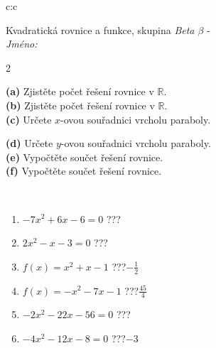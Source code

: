 \documentclass[10pt]{report}
\begin{document}
\begin{tabular}{c:c}
\begin{minipage}[c][104.5mm][t]{0.5\linewidth}
\begin{center}
\vspace{7mm}
{\huge \LARGE Kvadratická rovnice a funkce, skupina \textit{Beta $\beta$} -}\\[5mm]
\textit{Jméno:}\phantom{xxxxxxxxxxxxxxxxxxxxxxxxxxxxxxxxxxxxxxxxxxxxxxxxxxxxxxxxxxxxxxxxx}\\[5mm]
\begin{minipage}{0.95\linewidth}
\begin{center}
{\small \begin{multicols}{2} \raggedright
\textbf{(a)} Zjistěte počet řešení rovnice v \(\mathbb{R}\). \\[1mm]
\textbf{(b)} Zjistěte počet řešení rovnice v \(\mathbb{R}\). \\[1mm]
\textbf{(c)} Určete \(x\)-ovou souřadnici vrcholu paraboly. \par \columnbreak
\textbf{(d)} Určete \(y\)-ovou souřadnici vrcholu paraboly. \\[1mm]
\textbf{(e)} Vypočtěte součet řešení rovnice. \\[1mm]
\textbf{(f)} Vypočtěte součet řešení rovnice.
\end{multicols}
}
\end{center}
\end{minipage}
\\[4mm]
\begin{minipage}{0.79\linewidth}
\begin{center}
\begin{varwidth}{\linewidth}
\begin{enumerate}
\Large
\item $-7x^2+6x-6=0$\quad \dotfill\; ???\;\dotfill {}
\item $2x^2-x-3=0$\quad \dotfill\; ???\;\dotfill {}
\item $f(x)=x^2+x-1$\quad \dotfill\; ???\;\dotfill \quad $-\frac{1}{2}$
\item $f(x)=-x^2-7x-1$\quad \dotfill\; ???\;\dotfill \quad $\frac{45}{4}$
\item $-2x^2-22x-56=0$\quad \dotfill\; ???\;\dotfill {}
\item $-4x^2-12x-8=0$\quad \dotfill\; ???\;\dotfill \quad $-3$
\end{enumerate}
\end{varwidth}
\end{center}
\end{minipage}

\end{center}
\end{minipage}
\end{tabular}
\end{document}
